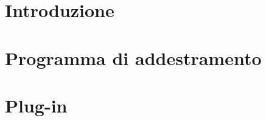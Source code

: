\documentclass{article}
\begin{document}


\newpage
\section{Introduzione}%
\label{sec:introduzione}


\newpage
\section{Programma di addestramento}%
\label{sec:addestramento}


\newpage
\section{Plug-in}%
\label{sec:plugin}

\end{document}
